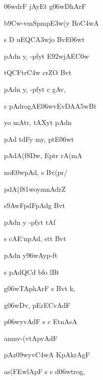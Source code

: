 \dnnemslokab 
{\dn {}\306wdrF jAyEt g\306wDhArF \dandadn\dontdisplaylinenum}

\dnnemslokac 
{\dn b\5\39Cw-vmSpmp\3E3w(y Bo\3C4wA}
\dontdisplaylinenum

\dnnemslokad 
{\dn s D\5 uEQC\3A3wjo BvE\306wt \vegdn\dontdisplaylinenum}


\ujvers\dnnemsloka 
{\dn pAd\?n y, -pf\0yt\? E\392wjAE\3C0w\2}
\dontdisplaylinenum

\dnnemslokab 
{\dn tQCFtr\3C4w\2 crZO Bv\?t \dandadn\dontdisplaylinenum}

\dnnemslokac 
{\dn pAd\?n y, -pf\0yt\? c gAv,}
\dontdisplaylinenum

\dnnemslokad 
{\dn s pAdrogAE\306wvEvDA\2\3A5wB\?t \vegdn\dontdisplaylinenum}


\ujvers\dnnemsloka 
{\dn yo mAtr, tAXyt\? pAd\?n}
\dontdisplaylinenum

\dnnemslokab 
{\dn pAd\? tdFy\? my, ptE\306wt \dandadn\dontdisplaylinenum}

\dnnemslokac 
{\dn pAdA(f\?\38Dw, Eptr\2 rA(mA}
\dontdisplaylinenum

\dnnemslokad 
{\dn {}no\3E0wpAd, s Bv\?(pr/ \vegdn\dontdisplaylinenum}


\ujvers\dnnemsloka 
{\dn pdA(f\?\381woymnAdr\?Z}
\dontdisplaylinenum

\dnnemslokab 
{\dn s\39AwFpdFpAdg\? Bv\?t \dandadn\dontdisplaylinenum}

\dnnemslokac 
{\dn pAd\?n y -pf\0yt\? tAf\2}
\dontdisplaylinenum

\dnnemslokad 
{\dn s cAE`npAd, stt\2 Bv\?t \vegdn\dontdisplaylinenum}


\ujvers\dnnemsloka 
{\dn pAd\?n y\396wAy\0p-f\?t}
\dontdisplaylinenum

\dnnemslokab 
{\dn s pAdQC\?d\2 bfo lB\?t \dandadn\dontdisplaylinenum}

\dnnemslokac 
{\dn g\5\306wTAphArF s Bv\?t k,}
\dontdisplaylinenum

\dnnemslokad 
{\dn {}g\0\306wDv, pErECvAdF \vegdn\dontdisplaylinenum}


\ujvers\dnnemsloka 
{\dn p\4\306wyvAdF s c EtnAsA}
\dontdisplaylinenum

\dnnemslokab 
{\dn anm\5v-(vtApvAdF \dandadn\dontdisplaylinenum}

\dnnemslokac 
{\dn pAz\309wyv\3C4wA KpAkrAgF}
\dontdisplaylinenum

\dnnemslokad 
{\dn as(\3FEwlApF s c d\306wtrog, \vegdn\dontdisplaylinenum}


